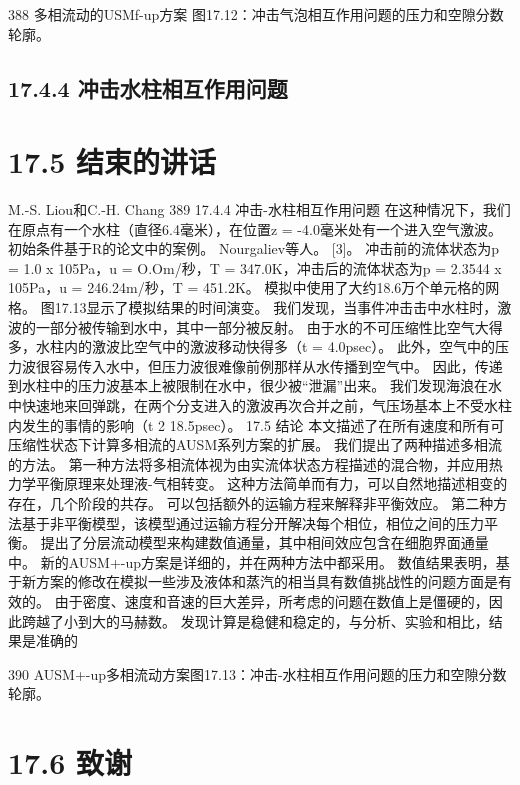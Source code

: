 \documentclass[UTF8,11pt,a4paper,openany,fontset=fandol]{ctexbook}
\begin{document}
388 多相流动的USMf-up方案 图17.12：冲击气泡相互作用问题的压力和空隙分数轮廓。

\subsection{17.4.4 冲击水柱相互作用问题}
\section{17.5 结束的讲话}
M.-S. Liou和C.-H. Chang 389 17.4.4 冲击-水柱相互作用问题 在这种情况下，我们在原点有一个水柱（直径6.4毫米），在位置z = -4.0毫米处有一个进入空气激波。 初始条件基于R的论文中的案例。 Nourgaliev等人。 [3]。 冲击前的流体状态为p = 1.0 x 105Pa，u = O.Om/秒，T = 347.0K，冲击后的流体状态为p = 2.3544 x 105Pa，u = 246.24m/秒，T = 451.2K。 模拟中使用了大约18.6万个单元格的网格。 图17.13显示了模拟结果的时间演变。 我们发现，当事件冲击击中水柱时，激波的一部分被传输到水中，其中一部分被反射。 由于水的不可压缩性比空气大得多，水柱内的激波比空气中的激波移动快得多（t = 4.0psec）。 此外，空气中的压力波很容易传入水中，但压力波很难像前例那样从水传播到空气中。 因此，传递到水柱中的压力波基本上被限制在水中，很少被“泄漏”出来。 我们发现海浪在水中快速地来回弹跳，在两个分支进入的激波再次合并之前，气压场基本上不受水柱内发生的事情的影响（t 2 18.5psec）。 17.5 结论 本文描述了在所有速度和所有可压缩性状态下计算多相流的AUSM系列方案的扩展。 我们提出了两种描述多相流的方法。 第一种方法将多相流体视为由实流体状态方程描述的混合物，并应用热力学平衡原理来处理液-气相转变。 这种方法简单而有力，可以自然地描述相变的存在，几个阶段的共存。 可以包括额外的运输方程来解释非平衡效应。 第二种方法基于非平衡模型，该模型通过运输方程分开解决每个相位，相位之间的压力平衡。 提出了分层流动模型来构建数值通量，其中相间效应包含在细胞界面通量中。 新的AUSM+-up方案是详细的，并在两种方法中都采用。 数值结果表明，基于新方案的修改在模拟一些涉及液体和蒸汽的相当具有数值挑战性的问题方面是有效的。 由于密度、速度和音速的巨大差异，所考虑的问题在数值上是僵硬的，因此跨越了小到大的马赫数。 发现计算是稳健和稳定的，与分析、实验和相比，结果是准确的

390 AUSM+-up多相流动方案图17.13：冲击-水柱相互作用问题的压力和空隙分数轮廓。

\section{17.6 致谢}
\end{document}
